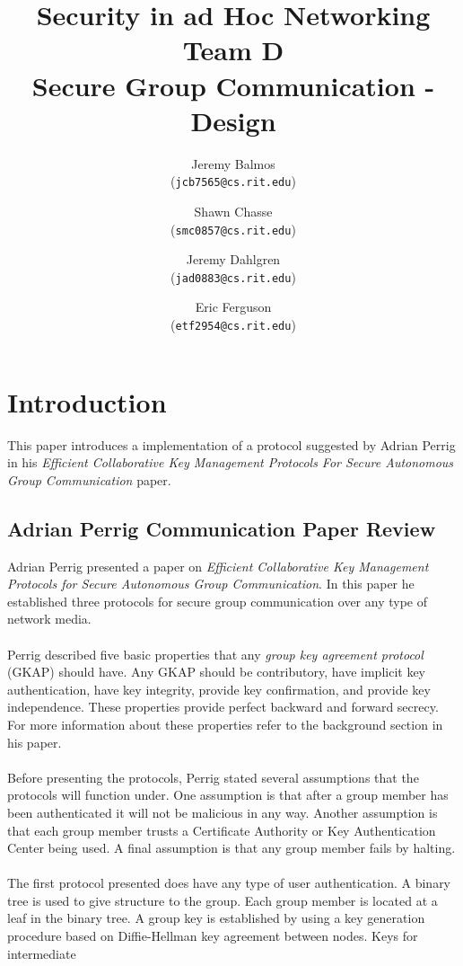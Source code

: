 \documentclass[12pt]{article}
\title{Security in ad Hoc Networking \\
	       Team D\\
       Secure Group Communication - Design}
\author{
    Jeremy Balmos \\
    (\texttt{jcb7565@cs.rit.edu})\\[1ex]
\and
    Shawn Chasse \\
    (\texttt{smc0857@cs.rit.edu})\\[1ex]
\and
    Jeremy Dahlgren \\
    (\texttt{jad0883@cs.rit.edu})\\[1ex]
\and
    Eric Ferguson \\
    (\texttt{etf2954@cs.rit.edu})\\[1ex]
}
\begin{document}
  \maketitle
  \newpage
  \tableofcontents
  \newpage
    \section{Introduction}
    \label{xref:introduction}
	This paper introduces a implementation of a protocol suggested by
	Adrian Perrig in his \textit{Efficient Collaborative Key Management 
	    Protocols For Secure Autonomous Group Communication} paper.

     \subsection{Adrian Perrig Communication Paper Review}
     \label{xfer:adrian_perrig_communication_paper_review}
     	Adrian Perrig presented a paper on \textit{Efficient Collaborative
    	Key Management Protocols for Secure Autonomous Group Communication}. 
	In this paper he established three protocols for secure group 
	communication over any type of network media.\\
	\\
	Perrig described five basic properties that any \textit{group key 
	agreement protocol} (GKAP) should have.  Any GKAP should be 
	contributory, have implicit key authentication, have key integrity, 
	provide key confirmation, and provide key independence.  These
	properties provide perfect backward and forward secrecy.  For more
	information about these properties refer to the background section
	in his paper.\\
	\\
	Before presenting the protocols, Perrig stated several assumptions that
	the protocols will function under.  One assumption is that after a 
	group member has been authenticated it will not be malicious in any
	way.  Another assumption is that each group member trusts a
	Certificate Authority or Key Authentication Center being used.  A final
	assumption is that any group member fails by halting.\\
	\\
	The first protocol presented does have any type of user 
	authentication.  A binary tree is used to give structure to the group.
	Each group member is located at a leaf in the binary tree.  A group
	key is established by using a key generation procedure based on 
	Diffie-Hellman key agreement between nodes.  Keys for intermediate
\end{document}
